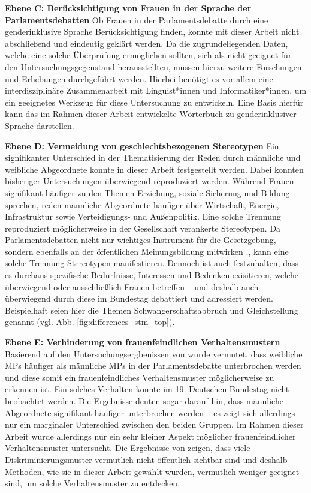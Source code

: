 \documentclass[12pt, 
    twoside=false, 
    bibliography=totoc, 
    numbers=endperiod, 
    headings=normal, 
    toc=chapterentrydotfill
    ]{scrbook}
\begin{document}
\noindent
\textbf{Ebene C: Berücksichtigung von Frauen in der Sprache der Parlamentsdebatten}
Ob Frauen in der Parlamentsdebatte durch eine genderinklusive Sprache Berücksichtigung finden, konnte mit dieser Arbeit nicht abschließend und eindeutig geklärt werden. Da die zugrundeliegenden Daten, welche eine solche Überprüfung ermöglichen sollten, sich als nicht geeignet für den Untersuchungsgegenstand herausstellten, müssen hierzu weitere Forschungen und Erhebungen durchgeführt werden. Hierbei benötigt es vor allem eine interdisziplinäre Zusammenarbeit mit Linguist*innen und Informatiker*innen, um ein geeignetes Werkzeug für diese Untersuchung zu entwickeln. Eine Basis hierfür kann das im Rahmen dieser Arbeit entwickelte Wörterbuch zu genderinklusiver Sprache darstellen.

\noindent    
\textbf{Ebene D: Vermeidung von geschlechtsbezogenen Stereotypen}
Ein signifikanter Unterschied in der Thematisierung der Reden durch männliche und weibliche Abgeordnete konnte in dieser Arbeit festgestellt werden. Dabei konnten bisheriger Untersuchungen überwiegend reproduziert werden. Während Frauen signifikant häufiger zu den Themen Erziehung, soziale Sicherung und Bildung sprechen, reden männliche Abgeordnete häufiger über Wirtschaft, Energie, Infrastruktur sowie Verteidigungs- und Außenpolitik. Eine solche Trennung reproduziert möglicherweise in der Gesellschaft verankerte Stereotypen. Da Parlamentsdebatten nicht nur wichtiges Instrument für die Gesetzgebung, sondern ebenfalls an der öffentlichen Meinungsbildung mitwirken \parencite[188]{dahlerup_2018}., kann eine solche Trennung Stereotypen manifestieren.
Dennoch ist auch festzuhalten, dass es durchaus spezifische Bedürfnisse, Interessen und Bedenken exisitieren, welche überwiegend oder ausschließlich Frauen betreffen -- und deshalb auch überwiegend durch diese im Bundestag debattiert und adressiert werden. Beispielhaft seien hier die Themen Schwangerschaftsabbruch und Gleichstellung genannt (vgl. Abb. \ref{fig:differences_stm_top}).

\noindent
\textbf{Ebene E: Verhinderung von frauenfeindlichen Verhaltensmustern}
Basierend auf den Untersuchungsergbenissen von \textcite{erikson_2018} wurde vermutet, dass weibliche MPs häufiger als männliche MPs in der Parlamentsdebatte unterbrochen werden und diese somit ein frauenfeindliches Verhaltensmuster möglicherweise zu erkennen ist. Ein solches Verhalten konnte im 19. Deutschen Bundestag nicht beobachtet werden. Die Ergebnisse deuten sogar darauf hin, dass männliche Abgeordnete signifikant häufiger unterbrochen werden -- es zeigt sich allerdings nur ein marginaler Unterschied zwischen den beiden Gruppen. Im Rahmen dieser Arbeit wurde allerdings nur ein sehr kleiner Aspekt möglicher frauenfeindlicher Verhaltensmuster untersucht. Die Ergebnisse von \textcite{erikson_2018} zeigen, dass viele Diskriminierungsmuster vermutlich nicht öffentlich sichtbar sind und deshalb Methoden, wie sie in dieser Arbeit gewählt wurden, vermutlich weniger geeignet sind, um solche Verhaltensmuster zu entdecken.
\end{document}
